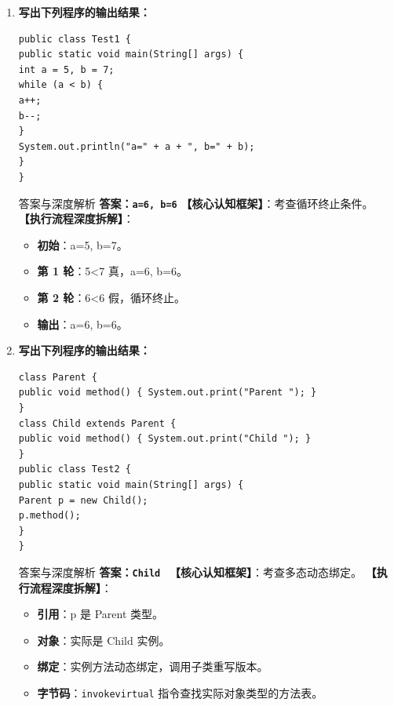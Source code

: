 \documentclass[12pt, a4paper]{ctexart}
\newcommand{\code}[1]{\texttt{#1}}
\begin{document}
\begin{enumerate}[label=\textbf{\arabic*.}, leftmargin=*, itemsep=1.5em]
\item \textbf{写出下列程序的输出结果：}
\begin{lstlisting}[style=JavaExam]
public class Test1 {
public static void main(String[] args) {
int a = 5, b = 7;
while (a < b) {
a++;
b--;
}
System.out.println("a=" + a + ", b=" + b);
}
}
\end{lstlisting}
\begin{bluebox}{答案与深度解析}
\textbf{答案：\code{a=6, b=6}}
\textbf{【核心认知框架】}：考查循环终止条件。
\textbf{【执行流程深度拆解】}：
\begin{itemize}[leftmargin=*, nosep]
    \item \textbf{初始}：a=5, b=7。
    \item \textbf{第 1 轮}：5<7 真，a=6, b=6。
    \item \textbf{第 2 轮}：6<6 假，循环终止。
    \item \textbf{输出}：a=6, b=6。
\end{itemize}
\end{bluebox}

\item \textbf{写出下列程序的输出结果：}
\begin{lstlisting}[style=JavaExam]
class Parent {
public void method() { System.out.print("Parent "); }
}
class Child extends Parent {
public void method() { System.out.print("Child "); }
}
public class Test2 {
public static void main(String[] args) {
Parent p = new Child();
p.method();
}
}
\end{lstlisting}
\begin{bluebox}{答案与深度解析}
\textbf{答案：\code{Child }}
\textbf{【核心认知框架】}：考查多态动态绑定。
\textbf{【执行流程深度拆解】}：
\begin{itemize}[leftmargin=*, nosep]
    \item \textbf{引用}：p 是 Parent 类型。
    \item \textbf{对象}：实际是 Child 实例。
    \item \textbf{绑定}：实例方法动态绑定，调用子类重写版本。
    \item \textbf{字节码}：\code{invokevirtual} 指令查找实际对象类型的方法表。
\end{itemize}
\end{bluebox}


\end{enumerate}
\end{document}
